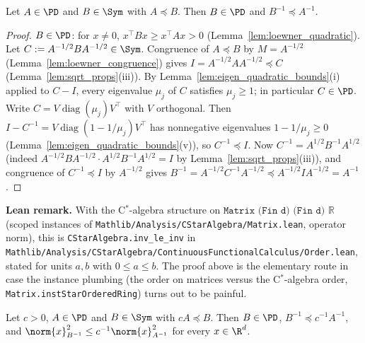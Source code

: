 \begin{lemma}\label{lem:loewner_inv}
\leanok
{}
Let $A \in \PD$ and $B \in \Sym$ with $A \preceq B$. Then $B \in \PD$ and $B^{-1} \preceq A^{-1}$.
\end{lemma}

\begin{proof}
\leanok
{}
$B \in \PD$: for $x \ne 0$, $x^\top B x \ge x^\top A x > 0$ (Lemma~\ref{lem:loewner_quadratic}).
Let $C := A^{-1/2} B A^{-1/2} \in \Sym$. Congruence of $A \preceq B$ by $M = A^{-1/2}$
(Lemma~\ref{lem:loewner_congruence}) gives $I = A^{-1/2} A A^{-1/2} \preceq C$
(Lemma~\ref{lem:sqrt_props}(iii)). By Lemma~\ref{lem:eigen_quadratic_bounds}(i) applied to
$C - I$, every eigenvalue $\mu_j$ of $C$ satisfies $\mu_j \ge 1$; in particular $C \in \PD$.
Write $C = V\operatorname{diag}(\mu_j)V^\top$ with $V$ orthogonal. Then
$I - C^{-1} = V\operatorname{diag}(1 - 1/\mu_j)V^\top$ has nonnegative eigenvalues
$1 - 1/\mu_j \ge 0$ (Lemma~\ref{lem:eigen_quadratic_bounds}(v)), so $C^{-1} \preceq I$. Now
$C^{-1} = A^{1/2} B^{-1} A^{1/2}$ (indeed $A^{-1/2}BA^{-1/2}\cdot A^{1/2}B^{-1}A^{1/2} = I$ by
Lemma~\ref{lem:sqrt_props}(iii)), and congruence of $C^{-1} \preceq I$ by $A^{-1/2}$ gives
$B^{-1} = A^{-1/2} C^{-1} A^{-1/2} \preceq A^{-1/2} I A^{-1/2} = A^{-1}$.
\end{proof}

\textbf{Lean remark.} With the C$^*$-algebra structure on $\texttt{Matrix (Fin d) (Fin d) ℝ}$
(scoped instances of \texttt{Mathlib/Analysis/CStarAlgebra/Matrix.lean}, operator norm), this is
\texttt{CStarAlgebra.inv\_le\_inv} in
\texttt{Mathlib/Analysis/CStarAlgebra/ContinuousFunctionalCalculus/Order.lean}, stated for units
$a, b$ with $0 \le a \le b$. The proof above is the elementary route in case the instance
plumbing (the order on matrices versus the C$^*$-algebra order,
\texttt{Matrix.instStarOrderedRing}) turns out to be painful.

\begin{lemma}\label{lem:loewner_scalar}
\leanok
{}
Let $c > 0$, $A \in \PD$ and $B \in \Sym$ with $cA \preceq B$. Then $B \in \PD$,
$B^{-1} \preceq c^{-1}A^{-1}$, and $\norm{x}_{B^{-1}}^2 \le c^{-1}\norm{x}_{A^{-1}}^2$ for every
$x \in \R^d$.
\end{lemma}


